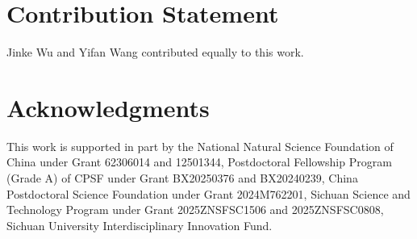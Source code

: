 

\section*{Contribution Statement}
Jinke Wu and Yifan Wang contributed equally to this work.

\section*{Acknowledgments}
This work is supported in part by the National Natural Science Foundation of China under Grant 62306014 and 12501344, Postdoctoral Fellowship Program (Grade A) of CPSF under Grant BX20250376 and BX20240239, China Postdoctoral Science Foundation under Grant 2024M762201, Sichuan Science and Technology Program under Grant 2025ZNSFSC1506 and 2025ZNSFSC0808, Sichuan University Interdisciplinary Innovation Fund.










